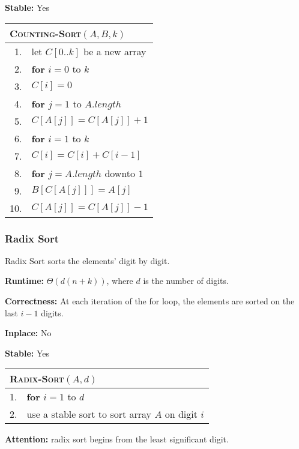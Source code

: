 \documentclass[a4paper,12pt]{article}
\begin{document}
\textbf{Stable:}
Yes

\begin{center}
	\begin{tabular}{rl}
		\toprule
		\multicolumn{2}{l}{\textsc{Counting-Sort}$(A, B, k)$} \\
		\midrule
		1. & let $C[0..k]$ be a new array \\
		2. & \textbf{for} $i = 0$ to $k$ \\
		3. & \quad $C[i] = 0$ \\
		4. & \textbf{for} $j = 1$ to $A.length$ \\
		5. & \quad $C[A[j]] = C[A[j]] + 1$ \\
		6. & \textbf{for} $i = 1$ to $k$ \\
		7. & \quad $C[i] = C[i] + C[i - 1]$ \\
		8. & \textbf{for} $j = A.length$ downto $1$ \\
		9. & \quad $B[C[A[j]]] = A[j]$ \\
		10. & \quad $C[A[j]] = C[A[j]] - 1$ \\
		\bottomrule
	\end{tabular}
\end{center}

\subsubsection{Radix Sort}

Radix Sort sorts the elements' digit by digit.

\textbf{Runtime:} 
$\Theta(d(n + k))$, where $d$ is the number of digits.

\textbf{Correctness:} 
At each iteration of the for loop, the elements are sorted on the last $i-1$ digits.

\textbf{Inplace:} 
No

\textbf{Stable:} 
Yes

\begin{center}
	\begin{tabular}{rl}
		\toprule
		\multicolumn{2}{l}{\textsc{Radix-Sort}$(A, d)$} \\
		\midrule
		1. & \textbf{for} $i = 1$ to $d$ \\
		2. & \quad use a stable sort to sort array $A$ on digit $i$ \\
		\bottomrule
	\end{tabular}
\end{center}

\textbf{Attention:} radix sort begins from the least significant digit.
\end{document}
